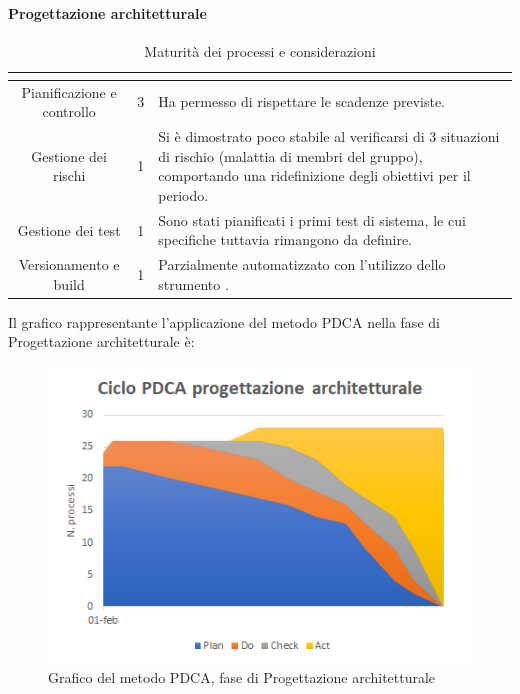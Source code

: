 \paragraph{Progettazione architetturale}\MiniSpazio
\renewcommand{\arraystretch}{1.5}
\begin{table}[H]
	\begin{center}
		\begin{tabular}{|c|c|p{6.8cm}|}
			\hline
			\rowcolor{title_row}
			\textbf{\color{title_text}{Processo}} & \textbf{\color{title_text}{Livello di maturità}} & \textbf{\color{title_text}{Considerazioni}} \\
			\hline
			{Pianificazione e controllo} & {3} & {Ha permesso di rispettare le scadenze previste.}\\	
			\hline
			{Gestione dei rischi} & {1} & {Si è dimostrato poco stabile al verificarsi di 3 situazioni di rischio (malattia di membri del gruppo), comportando una ridefinizione degli obiettivi per il periodo.}\\	
			\hline
			{Gestione dei test} & {1} & {Sono stati pianificati i primi test di sistema, le cui specifiche tuttavia rimangono da definire.}\\	
			\hline
			{Versionamento e build} & {1} & {Parzialmente automatizzato con l'utilizzo dello strumento \gl{Travis}.}\\	
			\hline
		\end{tabular}
		\caption[Maturità dei processi, Progettazione Architetturale]{Maturità dei processi e considerazioni}	
		\label{tabella: considerazioni sulla maturità dei processi raggiunta pa}
	\end{center}
\end{table}
\renewcommand{\arraystretch}{1}
Il grafico rappresentante l'applicazione del metodo PDCA nella fase di Progettazione architetturale è:
\begin{figure} [H]
	\centering
	\includegraphics[scale=1]{Img/Ciclo_PDCA_progettazione_architetturale}
	\caption{Grafico del metodo PDCA, fase di Progettazione architetturale}\label{}
\end{figure}
